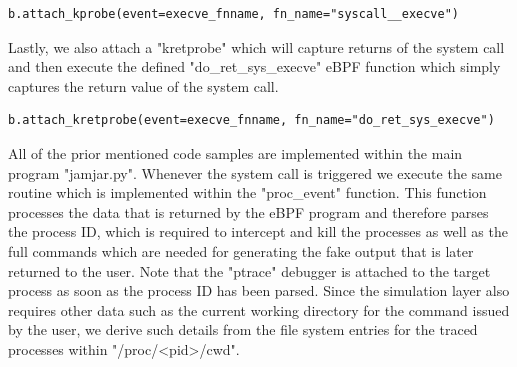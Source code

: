 \begin{lstlisting}
b.attach_kprobe(event=execve_fnname, fn_name="syscall__execve")
\end{lstlisting}
Lastly, we also attach a "kretprobe" which will capture returns of the system call and then execute the defined "do\_ret\_sys\_execve" eBPF function which simply captures the return value of the system call. 
\begin{lstlisting}
b.attach_kretprobe(event=execve_fnname, fn_name="do_ret_sys_execve")
\end{lstlisting}
All of the prior mentioned code samples are implemented within the main program "jamjar.py". Whenever the system call is triggered we execute the same routine which is implemented within the "proc\_event" function. This function processes the data that is returned by the eBPF program and therefore parses the process ID, which is required to intercept and kill the processes as well as the full commands which are needed for generating the fake output that is later returned to the user. Note that the "ptrace" debugger is attached to the target process as soon as the process ID has been parsed. Since the simulation layer also requires other data such as the current working directory for the command issued by the user, we derive such details from the file system entries for the traced processes within "/proc/<pid>/cwd". 

\newpage

